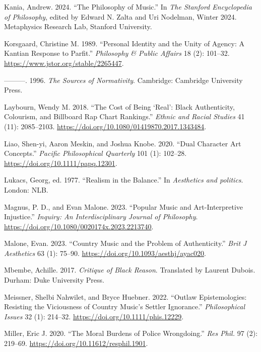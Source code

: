 \documentclass[
  letterpaper,
  DIV=11,
  numbers=noendperiod]{scrreprt}
\newlength{\cslhangindent}
\newenvironment{CSLReferences}[2] %
 {\begin{list}{}{%
  \setlength{\itemindent}{0pt}
  \setlength{\leftmargin}{0pt}
  \setlength{\parsep}{0pt}
  \ifodd #1
   \setlength{\leftmargin}{\cslhangindent}
   \setlength{\itemindent}{-1\cslhangindent}
  \fi
  \setlength{\itemsep}{#2\baselineskip}}}
 {\end{list}}
\begin{document}
\begin{tcolorbox}[enhanced jigsaw, arc=.35mm, breakable, rightrule=.15mm, colback=white, colframe=quarto-callout-important-color-frame, bottomrule=.15mm, leftrule=.75mm, opacityback=0, toprule=.15mm, left=2mm]
\begin{tcolorbox}[enhanced jigsaw, arc=.35mm, breakable, rightrule=.15mm, colback=white, colframe=quarto-callout-tip-color-frame, bottomrule=.15mm, leftrule=.75mm, opacityback=0, toprule=.15mm, left=2mm]
\begin{CSLReferences}{1}{0}
Kania, Andrew. 2024. {``The {Philosophy} of {Music}.''} In \emph{The
{Stanford Encyclopedia} of {Philosophy}}, edited by Edward N. Zalta and
Uri Nodelman, Winter 2024. Metaphysics Research Lab, Stanford
University.

Korsgaard, Christine M. 1989. {``Personal {Identity} and the {Unity} of
{Agency}: {A Kantian Response} to {Parfit}.''} \emph{Philosophy \&
Public Affairs} 18 (2): 101--32.
\url{https://www.jstor.org/stable/2265447}.

---------. 1996. \emph{The {Sources} of {Normativity}}. Cambridge:
Cambridge University Press.

Laybourn, Wendy M. 2018. {``The Cost of Being {`Real'}: Black
Authenticity, Colourism, and {Billboard Rap Chart} Rankings.''}
\emph{Ethnic and Racial Studies} 41 (11): 2085--2103.
\url{https://doi.org/10.1080/01419870.2017.1343484}.

Liao, Shen-yi, Aaron Meskin, and Joshua Knobe. 2020. {``Dual {Character
Art Concepts}.''} \emph{Pacific Philosophical Quarterly} 101 (1):
102--28. \url{https://doi.org/10.1111/papq.12301}.

Lukacs, Georg, ed. 1977. {``{Realism in the Balance}.''} In
\emph{{Aesthetics and politics}}. London: NLB.

Magnus, P. D., and Evan Malone. 2023. {``Popular {Music} and
{Art-Interpretive Injustice}.''} \emph{Inquiry: An Interdisciplinary
Journal of Philosophy}.
\url{https://doi.org/10.1080/0020174x.2023.2213740}.

Malone, Evan. 2023. {``Country {Music} and the {Problem} of
{Authenticity}.''} \emph{Brit J Aesthetics} 63 (1): 75--90.
\url{https://doi.org/10.1093/aesthj/ayac020}.

Mbembe, Achille. 2017. \emph{Critique of {Black Reason}}. Translated by
Laurent Dubois. Durham: Duke University Press.

Meissner, Shelbi Nahwilet, and Bryce Huebner. 2022. {``Outlaw
{Epistemologies}: {Resisting} the {Viciousness} of {Country Music}'s
{Settler Ignorance}.''} \emph{Philosophical Issues} 32 (1): 214--32.
\url{https://doi.org/10.1111/phis.12229}.

Miller, Eric J. 2020. {``The {Moral Burdens} of {Police Wrongdoing}.''}
\emph{Res Phil.} 97 (2): 219--69.
\url{https://doi.org/10.11612/resphil.1901}.


\end{CSLReferences}
\end{tcolorbox}
\end{tcolorbox}
\end{document}
